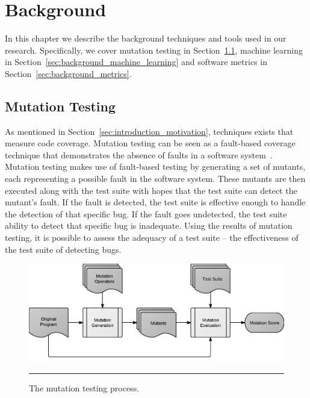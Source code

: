 \chapter{Background}
\label{chap:background}
In this chapter we describe the background techniques and tools used in our research. Specifically, we cover mutation testing in Section~\ref{sec:background_mutation_testing}, machine learning in Section~\ref{sec:background_machine_learning} and software metrics in Section~\ref{sec:background_metrics}.


\section{Mutation Testing}
\label{sec:background_mutation_testing}
As mentioned in Section~\ref{sec:introduction_motivation}, techniques exists that measure code coverage. Mutation testing can be seen as a fault-based coverage technique that demonstrates the absence of faults in a software system~\cite{DLS78, BDLS80}. Mutation testing makes use of fault-based testing by generating a set of mutants, each representing a possible fault in the software system. These mutants are then executed along with the test suite with hopes that the test suite can detect the mutant's fault. If the fault is detected, the test suite is effective enough to handle the detection of that specific bug. If the fault goes undetected, the test suite ability to detect that specific bug is inadequate. Using the results of mutation testing, it is possible to assess the adequacy of a test suite -- the effectiveness of the test suite of detecting bugs.

\begin{figure}[!tb]
  \centering
  \includegraphics[width=14cm]{figures/mutation_testing_overview.pdf}
  \caption{The mutation testing process.}
  \label{fig:mutation_testing_overview}
  \vspace{2mm}
  \hrule
\end{figure}

